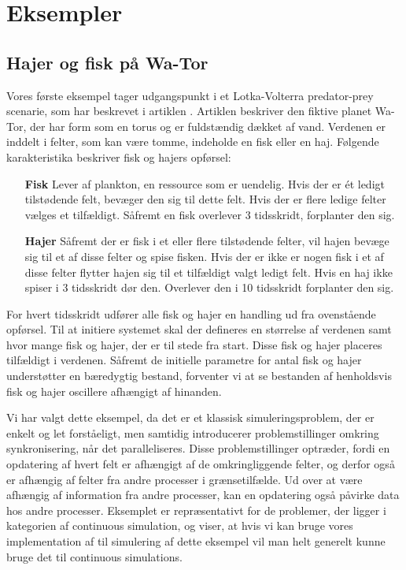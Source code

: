 \section{Eksempler}\label{sec:des-examples}


\subsection{Hajer og fisk på Wa-Tor} 
Vores første eksempel tager  udgangspunkt i et Lotka-Volterra predator-prey scenarie, som \citeauthor{wator}
har beskrevet i artiklen \cite{wator}. Artiklen beskriver den
fiktive planet Wa-Tor, der har form som en torus og er fuldstændig
dækket af vand. Verdenen er inddelt i felter, som kan være tomme, indeholde en
fisk eller en haj\cite[20]{wator}. Følgende karakteristika beskriver fisk og hajers
opførsel:

\begin{itemize}
\item[\textbf{Fisk}]
Lever af plankton, en ressource som er uendelig. Hvis der er ét ledigt 
tilstødende felt, bevæger den sig til dette felt. Hvis der er flere ledige 
felter vælges et tilfældigt. Såfremt en fisk overlever 3 tidsskridt, forplanter 
den sig.
\item[\textbf{Hajer}]
Såfremt der er fisk i et eller flere tilstødende felter, vil hajen bevæge sig 
til et af disse felter og spise fisken. Hvis der er ikke er nogen fisk i et af 
disse felter flytter hajen sig til et tilfældigt valgt ledigt felt. Hvis en haj 
ikke spiser i 3 tidsskridt dør den. Overlever den i 10 tidsskridt forplanter 
den sig.
\end{itemize}

For hvert tidsskridt udfører alle fisk og hajer en handling ud fra
ovenstående opførsel.
Til at initiere systemet skal der defineres en størrelse af verdenen
samt hvor mange fisk og hajer, der er til stede fra start. Disse fisk og
hajer placeres tilfældigt i verdenen.
Såfremt de initielle parametre for antal fisk og hajer understøtter en 
bæredygtig bestand, forventer vi at se bestanden af henholdsvis fisk og hajer 
oscillere afhængigt af hinanden.

Vi har valgt dette eksempel, da det er et klassisk simuleringsproblem, der er enkelt og let forståeligt, men samtidig 
introducerer problemstillinger omkring synkronisering, når det paralleliseres.  
Disse problemstillinger optræder, fordi en opdatering af hvert felt er afhængigt 
af de omkringliggende felter, og derfor også er afhængig af felter fra andre 
processer i grænsetilfælde. Ud over at være afhængig af information fra andre 
processer, kan en opdatering også påvirke data hos andre processer. Eksemplet er repræsentativt for de problemer, der ligger i kategorien af continuous simulation, og viser, at hvis vi kan bruge vores implementation af \des til simulering af dette eksempel vil man helt generelt kunne bruge det til continuous simulations.

